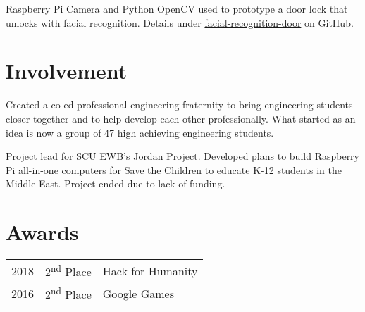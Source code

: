 \documentclass[]{deedy-resume-openfont}
\begin{document}
\begin{minipage}[t]{0.66\textwidth}
\begin{tightemize}
\item Raspberry Pi Camera and Python OpenCV used to prototype a door lock that unlocks with facial recognition. Details under {\href{https://github.com/zachbellay/facial-recognition-door}{facial-recognition-door}}  on GitHub.
\end{tightemize}
\sectionsep





\section{Involvement}
\begin{tightemize}
\item Created a co-ed professional engineering fraternity to bring
engineering students closer together and to help develop each other
professionally. What started as an idea is now a group of 47 high achieving
engineering students. 
\end{tightemize}
\sectionsep

\begin{tightemize}
\item Project lead for SCU EWB’s Jordan Project. Developed plans to build
Raspberry Pi all-in-one computers for Save the Children to educate K-12
students in the Middle East. Project ended due to lack of funding.
\end{tightemize}
\sectionsep



\section{Awards} 
\begin{tabular}{rll}
2018	     & 2\textsuperscript{nd} Place  & Hack for Humanity\\
2016	     & 2\textsuperscript{nd} Place  & Google Games\\
\end{tabular}
\sectionsep


\end{minipage} 
\end{document}
